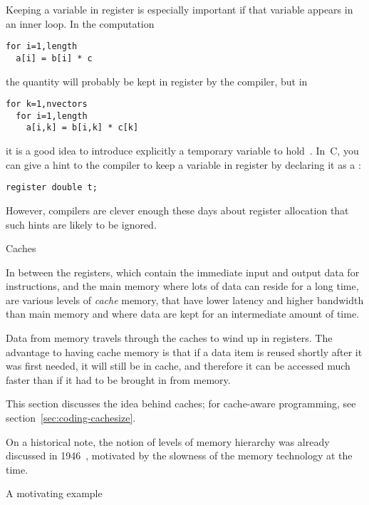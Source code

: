 Keeping a variable in register is especially important if that
variable appears in an inner loop. In the computation
\begin{lstlisting}
for i=1,length
  a[i] = b[i] * c
\end{lstlisting}
the quantity  will probably be kept in register by the compiler,
but in 
\begin{lstlisting}
for k=1,nvectors
  for i=1,length
    a[i,k] = b[i,k] * c[k]
\end{lstlisting}
it is a good idea to introduce explicitly a temporary variable to
hold~. In~C, you can give a hint to the compiler
to keep a variable in register by declaring it as a :
\begin{lstlisting}
register double t;
\end{lstlisting}
However, compilers are clever enough these days about register allocation
that such hints are likely to be ignored.


 {Caches}
\label{sec:cache}

In between the registers, which contain the immediate input and output
data for instructions, and the main memory where lots of data can reside for a
long time, are various levels of \emph{cache} memory, that have
lower latency and higher bandwidth than main memory and where data are
kept for an intermediate amount of time.  

Data from
memory travels through the caches to wind up in registers. The
advantage to having cache memory is that if a data item is reused
shortly after it was first needed, it will still be in cache, and
therefore it can be accessed much faster than if it had to be
brought in from memory.

This section discusses the idea behind caches;
for cache-aware programming, see section~\ref{sec:coding-cachesize}.

On a historical note, the notion of levels of memory hierarchy was
already discussed in 1946~\cite{Burks:discussion}, motivated
by the slowness of the memory technology at the time.

 {A motivating example}


